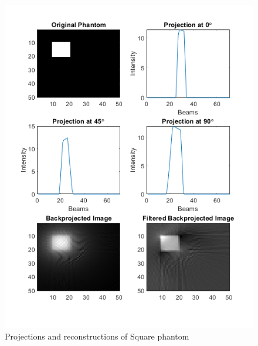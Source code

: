\documentclass[journal]{IEEEtran}
\begin{document}
\begin{figure}[h]
	\centering
	\includegraphics[width=\columnwidth,height=.3\textheight]{images/square_projected.png}
	\caption{Projections and reconstructions of Square phantom}\label{fig:squareprojected}
\end{figure}
\end{document}
